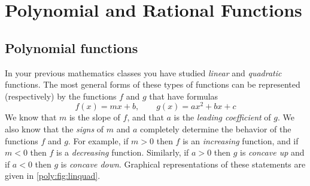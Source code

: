 %
%
\chapter{Polynomial and Rational Functions}
\minitoc
\section{Polynomial functions}
In your previous mathematics classes you have studied \emph{linear} and 
\emph{quadratic} functions. The most general forms of these types of 
functions can be represented (respectively) by  the functions $f$ 
and $g$ that have formulas
\begin{equation}\label{poly:eq:linquad}
	f(x)=mx+b, \qquad g(x)=ax^2+bx+c
\end{equation}
We know that $m$ is the slope of $f$, and that $a$ is the \emph{leading coefficient} 
of $g$. We also know that the \emph{signs} of $m$ and $a$ completely 
determine the behavior of the functions $f$ and $g$. For example, if $m>0$
then $f$ is an \emph{increasing} function, and if $m<0$ then $f$ is 
a \emph{decreasing} function.  Similarly, if $a>0$ then $g$ is 
\emph{concave up} and if $a<0$ then $g$ is \emph{concave down}. Graphical 
representations of these statements are given in \cref{poly:fig:linquad}.

